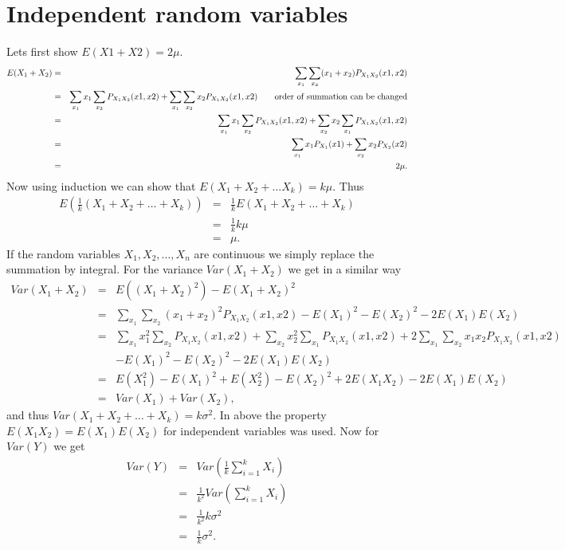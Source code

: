 \documentclass[article,11pt]{article}
\begin{document}
\section{Independent random variables}
Lets first show $E(X1 + X2) =2\mu$.
\begin{eqnarray}
  E(X_1 + X_2) &=& \sum_{x_1}\sum_{x_2}(x_1+x_2)P_{X_1X_2}(x1,x2)\nonumber\\
  &=&\sum_{x_1}x_1\sum_{x_2}P_{X_1X_2}(x1,x2)+ \sum_{x_1}\sum_{x_2}x_2P_{X_1X_2}(x1,x2)\text{\qquad order of summation can be changed}\nonumber\\
  &=&\sum_{x_1}x_1\sum_{x_2}P_{X_1X_2}(x1,x2)+ \sum_{x_2}x_2\sum_{x_1}P_{X_1X_2}(x1,x2)\nonumber\\
  &=&\sum_{x_1}x_1P_{X_1}(x1)+ \sum_{x_2}x_2P_{X_2}(x2)\nonumber\\
  &=&2\mu.
\end{eqnarray}
Now using induction we can show that $E(X_1 + X_2 + \ldots X_k) = k\mu$. Thus
\begin{eqnarray}
  E(\frac{1}{k}(X_1 + X_2 + \ldots + X_k))&=&\frac{1}{k}E(X_1 + X_2 + \ldots + X_k)\nonumber\\
  &=&\frac{1}{k}k\mu\nonumber\\
  &=&\mu.
\end{eqnarray}
If the random variables $X_1,X_2,\ldots,X_n$ are continuous we simply replace the summation by integral.
For the variance $Var(X_1 + X_2)$ we get in a similar way
\begin{eqnarray}
  Var(X_1 + X_2) &=& E((X_1+X_2)^2) - E(X_1 + X_2)^2\nonumber\\
  &=&\sum_{x_1}\sum_{x_2}(x_1 + x_2)^2P_{X_1X_2}(x1,x2)-E(X_1)^2-E(X_2)^2-2E(X_1)E(X_2)\nonumber\\
  &=&\sum_{x_1}x_1^2\sum_{x_2}P_{X_1X_2}(x1,x2)+\sum_{x_2}x_2^2\sum_{x_1}P_{X_1X_2}(x1,x2)+2\sum_{x_1}\sum_{x_2}x_1x_2P_{X_1X_2}(x1,x2)\nonumber\\
  & &-E(X_1)^2-E(X_2)^2-2E(X_1)E(X_2)\nonumber\\
  &=&E(X_1^2)-E(X_1)^2+E(X_2^2)-E(X_2)^2+2E(X_1X_2)-2E(X_1)E(X_2)\nonumber\\
  &=&Var(X_1)+Var(X_2),
\end{eqnarray}
and thus $Var(X_1 + X_2 + \ldots + X_k)=k\sigma^2$. In above the property $E(X_1X_2) = E(X_1)E(X_2)$ for independent variables was used.
Now for $Var(Y)$ we get
\begin{eqnarray}
  Var(Y) &=&Var(\frac{1}{k}\sum_{i=1}^kX_i)\nonumber\\
  &=&\frac{1}{k^2}Var(\sum_{i=1}^kX_i)\nonumber\\
  &=&\frac{1}{k^2}k\sigma^2\nonumber\\
  &=&\frac{1}{k}\sigma^2.
\end{eqnarray}
\end{document}
